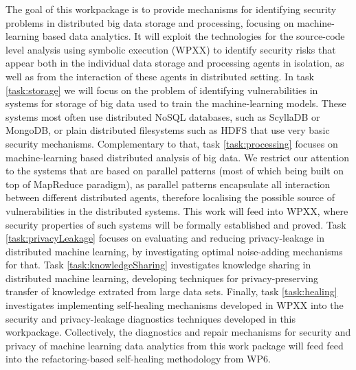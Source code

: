 \begin{Workpackage}{\thewpno}
\begin{WPDescription}
  The goal of this workpackage is to provide mechanisms for identifying security problems in distributed big data storage and processing, focusing on machine-learning based data analytics. It will exploit the technologies for the source-code level analysis using symbolic execution (WPXX) to identify security risks that appear both in the individual data storage and processing agents in isolation, as well as from the interaction of these agents in distributed setting. In task \ref{task:storage} we will focus on the problem of identifying vulnerabilities in systems for storage of big data used to train the machine-learning models. These systems most often use distributed NoSQL databases, such as ScyllaDB or MongoDB, or plain distributed filesystems such as HDFS that use very basic security mechanisms. Complementary to that, task \ref{task:processing} focuses on machine-learning based distributed analysis of big data. We restrict our attention to the systems that are based on parallel patterns (most of which being built on top of MapReduce paradigm), as parallel patterns encapsulate all interaction between different distributed agents, therefore localising the possible source of vulnerabilities in the distributed systems. This work will feed into WPXX, where security properties of such systems will be formally established and proved. Task \ref{task:privacyLeakage} focuses on evaluating and reducing privacy-leakage in distributed machine learning, by investigating optimal noise-adding mechanisms for that. Task \ref{task:knowledgeSharing} investigates knowledge sharing in distributed machine learning, developing techniques for privacy-preserving transfer of knowledge extrated from large data sets. Finally, task \ref{task:healing} investigates implementing self-healing mechanisms developed in WPXX into the security and privacy-leakage diagnostics techniques developed in this workpackage. Collectively, the diagnostics and repair mechanisms for security and privacy of machine learning data analytics from this work package will feed feed into the refactoring-based self-healing methodology from WP6. 
\end{WPDescription}

\begin{Task}


\end{Task}
\end{Workpackage}
